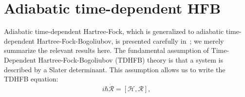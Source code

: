 %
%




\section{Adiabatic time-dependent HFB}

Adiabatic time-dependent Hartree-Fock, which is generalized to adiabatic time-dependent Hartree-Fock-Bogoliubov, is presented carefully in~\cite{engel1975, Baranger1978}; we merely summarize the relevant results here. The fundamental assumption of Time-Dependent Hartree-Fock-Bogoliubov (TDHFB) theory is that a system is described by a Slater determinant. This assumption allows us to write the TDHFB equation:
\begin{equation}\label{eq:TDHFB}
i\hbar \mathcal{\dot{R}} = \left[\mathcal{H},\mathcal{R}\right],
\end{equation}

